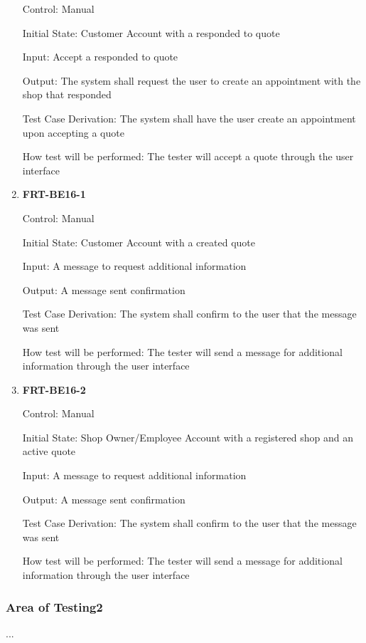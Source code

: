 \documentclass[12pt, titlepage]{article}
\begin{document}
\begin{enumerate}
	      Control: Manual

	      Initial State: Customer Account with a responded to quote

	      Input: Accept a responded to quote

	      Output: The system shall request the user to create an appointment with the shop that responded

	      Test Case Derivation: The system shall have the user create an appointment upon accepting a quote

	      How test will be performed: The tester will accept a quote through the user interface

	\item \textbf{FRT-BE16-1}

	      Control: Manual

	      Initial State: Customer Account with a created quote

	      Input: A message to request additional information

	      Output: A message sent confirmation

	      Test Case Derivation: The system shall confirm to the user that the message was sent

	      How test will be performed: The tester will send a message for additional information through the
	      user interface

	\item \textbf{FRT-BE16-2}

	      Control: Manual

	      Initial State: Shop Owner/Employee Account with a registered shop and an active quote

	      Input: A message to request additional information

	      Output: A message sent confirmation

	      Test Case Derivation: The system shall confirm to the user that the message was sent

	      How test will be performed: The tester will send a message for additional information through the
	      user interface

\end{enumerate}

\subsubsection{Area of Testing2}

...
\end{document}
